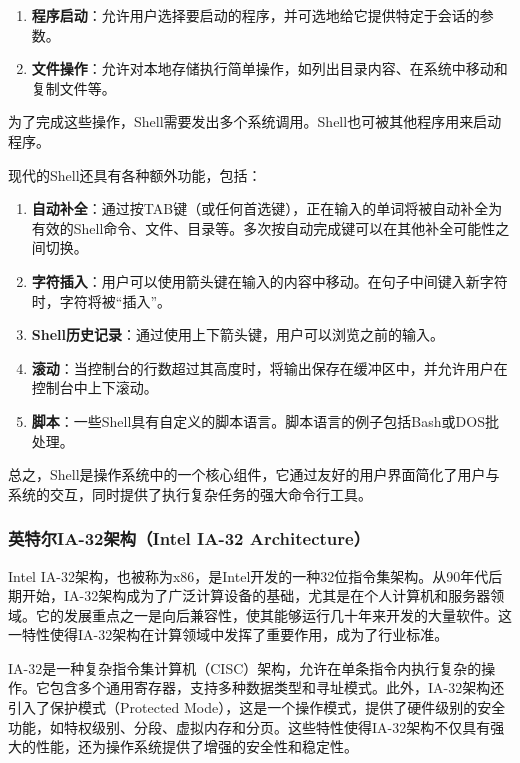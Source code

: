 \begin{enumerate}
    \item \textbf{程序启动}：允许用户选择要启动的程序，并可选地给它提供特定于会话的参数。
    \item \textbf{文件操作}：允许对本地存储执行简单操作，如列出目录内容、在系统中移动和复制文件等。
\end{enumerate}

为了完成这些操作，Shell需要发出多个系统调用。Shell也可被其他程序用来启动程序。

现代的Shell还具有各种额外功能，包括：

\begin{enumerate}
    \item \textbf{自动补全}：通过按TAB键（或任何首选键），正在输入的单词将被自动补全为有效的Shell命令、文件、目录等。多次按自动完成键可以在其他补全可能性之间切换。
    \item \textbf{字符插入}：用户可以使用箭头键在输入的内容中移动。在句子中间键入新字符时，字符将被“插入”。
    \item \textbf{Shell历史记录}：通过使用上下箭头键，用户可以浏览之前的输入。
    \item \textbf{滚动}：当控制台的行数超过其高度时，将输出保存在缓冲区中，并允许用户在控制台中上下滚动。
    \item \textbf{脚本}：一些Shell具有自定义的脚本语言。脚本语言的例子包括Bash或DOS批处理。
\end{enumerate}

总之，Shell是操作系统中的一个核心组件，它通过友好的用户界面简化了用户与系统的交互，同时提供了执行复杂任务的强大命令行工具。

\subsubsection{英特尔IA-32架构（Intel IA-32 Architecture）}

Intel IA-32架构，也被称为x86，是Intel开发的一种32位指令集架构。从90年代后期开始，IA-32架构成为了广泛计算设备的基础，尤其是在个人计算机和服务器领域。它的发展重点之一是向后兼容性，使其能够运行几十年来开发的大量软件。这一特性使得IA-32架构在计算领域中发挥了重要作用，成为了行业标准。

IA-32是一种复杂指令集计算机（CISC）架构，允许在单条指令内执行复杂的操作。它包含多个通用寄存器，支持多种数据类型和寻址模式。此外，IA-32架构还引入了保护模式（Protected Mode），这是一个操作模式，提供了硬件级别的安全功能，如特权级别、分段、虚拟内存和分页。这些特性使得IA-32架构不仅具有强大的性能，还为操作系统提供了增强的安全性和稳定性。

